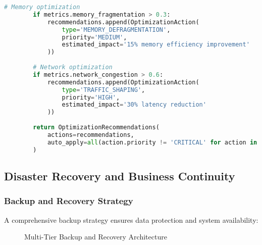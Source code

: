 \begin{lstlisting}[language=Python, caption={Performance Monitoring System}, label={lst:performance-monitoring}]
        # Memory optimization
        if metrics.memory_fragmentation > 0.3:
            recommendations.append(OptimizationAction(
                type='MEMORY_DEFRAGMENTATION',
                priority='MEDIUM',
                estimated_impact='15% memory efficiency improvement'
            ))
        
        # Network optimization
        if metrics.network_congestion > 0.6:
            recommendations.append(OptimizationAction(
                type='TRAFFIC_SHAPING',
                priority='HIGH',
                estimated_impact='30% latency reduction'
            ))
        
        return OptimizationRecommendations(
            actions=recommendations,
            auto_apply=all(action.priority != 'CRITICAL' for action in recommendations)
        )
\end{lstlisting}

\subsection{Disaster Recovery and Business Continuity}

\subsubsection{Backup and Recovery Strategy}
A comprehensive backup strategy ensures data protection and system availability:

\begin{figure}[htbp]
\centering
{}
\caption{Multi-Tier Backup and Recovery Architecture}
\label{fig:backup-architecture}
\end{figure}

